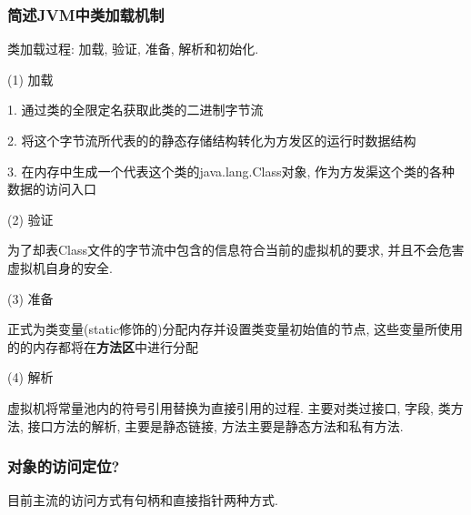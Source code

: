 \subsubsection{简述JVM中类加载机制}
类加载过程: 加载, 验证, 准备, 解析和初始化. \par
(1) 加载 \par
1. 通过类的全限定名获取此类的二进制字节流 \par
2. 将这个字节流所代表的的静态存储结构转化为方发区的运行时数据结构 \par
3. 在内存中生成一个代表这个类的java.lang.Class对象, 作为方发渠这个类的各种数据的访问入口 \par
(2) 验证 \par
为了却表Class文件的字节流中包含的信息符合当前的虚拟机的要求, 并且不会危害虚拟机自身的安全. \par
(3) 准备 \par
正式为类变量(static修饰的)分配内存并设置类变量初始值的节点, 这些变量所使用的的内存都将在\textbf{方法区}中进行分配 \par
(4) 解析 \par
虚拟机将常量池内的符号引用替换为直接引用的过程. 主要对类过接口, 字段, 类方法, 接口方法的解析, 主要是静态链接, 方法主要是静态方法和私有方法. \par
\subsubsection{对象的访问定位?}
目前主流的访问方式有句柄和直接指针两种方式.

